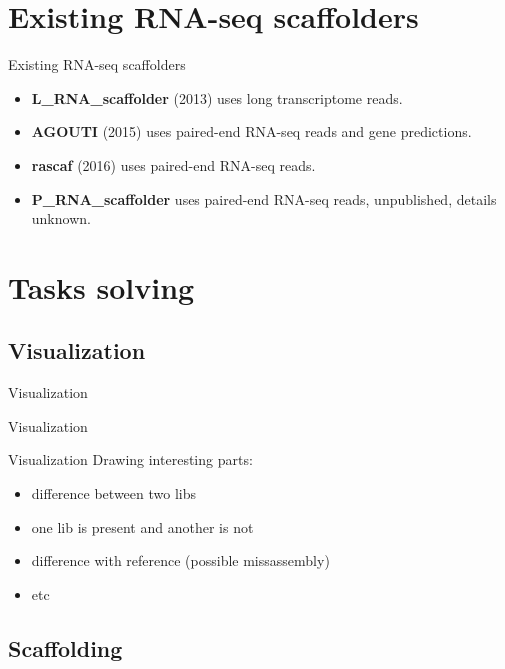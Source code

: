 \documentclass{beamer}
\newcommand{\cimg}[2]{%
	\begin{center}%
		\ifthenelse{\equal{#2}{}}{%
			\texttt{[image: \#1]}
		}{%
			\texttt{[image: \#1]}
		}%
	\end{center}%
}
\begin{document}
\section{Existing RNA-seq scaffolders}
\begin{frame}[t]{Existing RNA-seq scaffolders}
\begin{itemize}
	\item {\bf L\_RNA\_scaffolder} (2013) uses long transcriptome reads.
	\item {\bf AGOUTI} (2015) uses paired-end RNA-seq reads and gene predictions.
	\item {\bf rascaf} (2016) uses paired-end RNA-seq reads.
	\item {\bf P\_RNA\_scaffolder} uses paired-end RNA-seq reads, unpublished, details unknown. 
\end{itemize}
\end{frame}

\section{Tasks solving}
\subsection{Visualization}

\begin{frame}[t]{Visualization}
\cimg{examp.jpg}{0.8}
\end{frame}

\begin{frame}[t]{Visualization}
\cimg{diflib.png}{1.03}
\end{frame}


\begin{frame}[t]{Visualization}
Drawing interesting parts:
\begin{itemize}
	\item difference between two libs 
	\item one lib is present and another is not
	\item difference with reference (possible missassembly)
	\item etc
\end{itemize}
\end{frame}

\subsection{Scaffolding}
\end{document}
